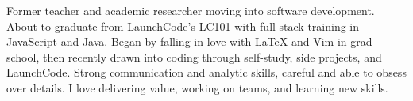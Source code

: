 

\begin{cvparagraph}

Former teacher and academic researcher moving into software development.  About to graduate from LaunchCode's LC101 with full-stack training in JavaScript and Java.  Began by falling in love with LaTeX and Vim in grad school, then recently drawn into coding through self-study, side projects, and LaunchCode.  Strong communication and analytic skills, careful and able to obsess over details.  I love delivering value, working on teams, and learning new skills.
\end{cvparagraph}
